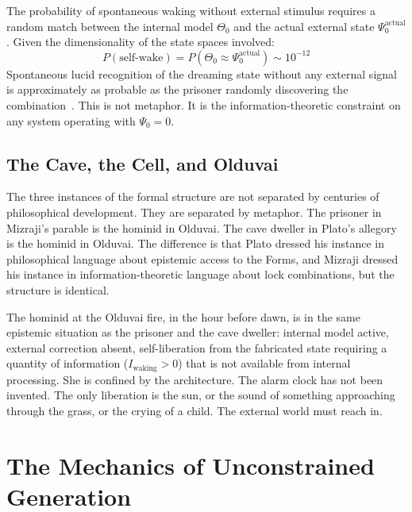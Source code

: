 The probability of spontaneous waking without external stimulus requires a random match between the internal model $\Theta_0$ and the actual external state $\Psi_0^{\mathrm{actual}}$. Given the dimensionality of the state spaces involved:
%
\begin{equation}
P(\mathrm{self\text{-}wake}) = P(\Theta_0 \approx \Psi_0^{\mathrm{actual}}) \sim 10^{-12}
\label{eq:selfwake}
\end{equation}
%
Spontaneous lucid recognition of the dreaming state without any external signal is approximately as probable as the prisoner randomly discovering the combination~\cite{author_dream}. This is not metaphor. It is the information-theoretic constraint on any system operating with $\Psi_0 = 0$.

\subsection{The Cave, the Cell, and Olduvai}

The three instances of the formal structure are not separated by centuries of philosophical development. They are separated by metaphor. The prisoner in Mizraji's parable is the hominid in Olduvai. The cave dweller in Plato's allegory is the hominid in Olduvai. The difference is that Plato dressed his instance in philosophical language about epistemic access to the Forms, and Mizraji dressed his instance in information-theoretic language about lock combinations, but the structure is identical.

The hominid at the Olduvai fire, in the hour before dawn, is in the same epistemic situation as the prisoner and the cave dweller: internal model active, external correction absent, self-liberation from the fabricated state requiring a quantity of information ($I_{\mathrm{waking}} > 0$) that is not available from internal processing. She is confined by the architecture. The alarm clock has not been invented. The only liberation is the sun, or the sound of something approaching through the grass, or the crying of a child. The external world must reach in.

\bigskip

\section{The Mechanics of Unconstrained Generation}

